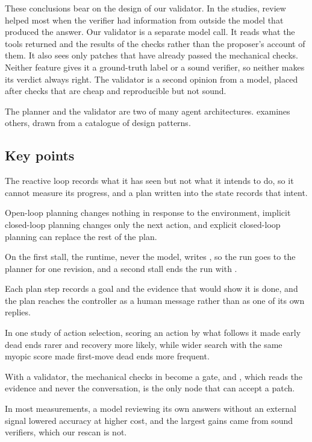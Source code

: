 These conclusions bear on the design of our validator. In the studies, review helped most when the
verifier had information from outside the model that produced the answer. Our validator is a separate
model call. It reads what the tools returned and the results of the checks rather than the proposer's
account of them. It also sees only patches that have already passed the mechanical checks. Neither
feature gives it a ground-truth label or a sound verifier, so neither makes its verdict always right.
The validator is a second opinion from a model, placed after checks that are cheap and reproducible
but not sound.

The planner and the validator are two of many agent architectures.  examines
others, drawn from a catalogue of design patterns.

\subsection*{Key points}
\bi
\item The reactive loop records what it has seen but not what it intends to do, so it cannot measure
its progress, and a plan written into the state records that intent.
\item Open-loop planning changes nothing in response to the environment, implicit closed-loop
planning changes only the next action, and explicit closed-loop planning can replace the rest of the
plan.
\item On the first stall, the runtime, never the model, writes , so the run goes
to the planner for one revision, and a second stall ends the run with .
\item Each plan step records a goal and the evidence that would show it is done, and the plan reaches
the controller as a human message rather than as one of its own replies.
\item In one study of action selection, scoring an action by what follows it made early dead ends
rarer and recovery more likely, while wider search with the same myopic score made first-move dead
ends more frequent.
\item With a validator, the mechanical checks in  become a gate, and
, which reads the evidence and never the conversation, is the only node that can
accept a patch.
\item In most measurements, a model reviewing its own answers without an external signal lowered
accuracy at higher cost, and the largest gains came from sound verifiers, which our rescan is not.
\ei

